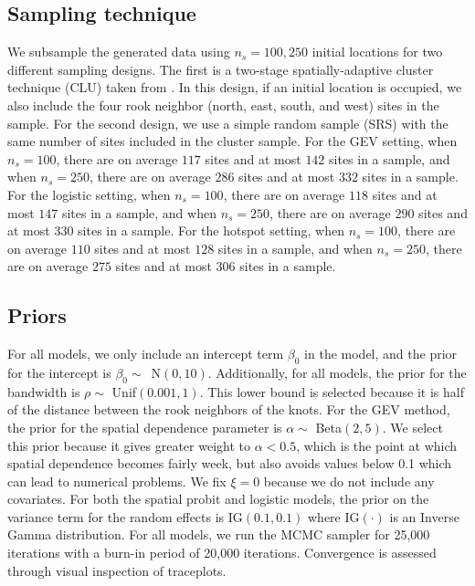 \subsection{Sampling technique} \label{rbs:simsampling}
We subsample the generated data using $n_s = 100, 250$ initial locations for two different sampling designs.
The first is a two-stage spatially-adaptive cluster technique (CLU) taken from \citet{Pacifici2016}.
In this design, if an initial location is occupied, we also include the four rook neighbor (north, east, south, and west) sites in the sample.
For the second design, we use a simple random sample (SRS) with the same number of sites included in the cluster sample.
For the GEV setting, when $n_s = 100$, there are on average $117$ sites and at most $142$ sites in a sample, and when $n_s = 250$, there are on average $286$ sites and at most $332$ sites in a sample.
For the logistic setting, when $n_s = 100$, there are on average $118$ sites and at most $147$ sites in a sample, and when $n_s = 250$, there are on average $290$ sites and at most $330$ sites in a sample.
For the hotspot setting, when $n_s = 100$, there are on average $110$ sites and at most $128$ sites in a sample, and when $n_s = 250$, there are on average $275$ sites and at most $306$ sites in a sample.

\subsection{Priors} \label{rbs:simpriors}
For all models, we only include an intercept term $\beta_0$ in the model, and the prior for the intercept is \mbox{$\beta_0 \sim$ N$(0, 10)$}.
Additionally, for all models, the prior for the bandwidth is $\rho \sim$ Unif$(0.001, 1)$.
This lower bound is selected because it is half of the distance between the rook neighbors of the knots.
For the GEV method, the prior for the spatial dependence parameter is $\alpha \sim$ Beta$(2, 5)$.
We select this prior because it gives greater weight to $\alpha < 0.5$, which is the point at which spatial dependence becomes fairly week, but also avoids values below 0.1 which can lead to numerical problems.
We fix $\xi = 0$ because we do not include any covariates.
For both the spatial probit and logistic models, the prior on the variance term for the random effects is IG$(0.1, 0.1)$ where IG$(\cdot)$ is an Inverse Gamma distribution.
For all models, we run the MCMC sampler for 25,000 iterations with a burn-in period of 20,000 iterations.
Convergence is assessed through visual inspection of traceplots.

